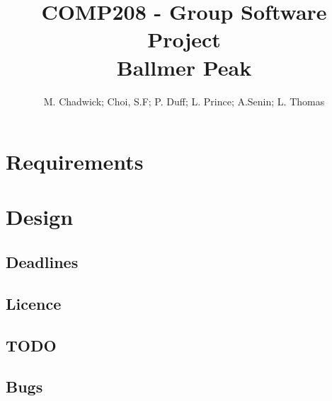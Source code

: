 \documentclass[openany]{book}
\title{COMP208 - Group Software Project\\Ballmer Peak}
\author{M. Chadwick; Choi, S.F; P. Duff; L. Prince; A.Senin; L. Thomas}
\begin{document}
\maketitle
\tableofcontents

\part{Requirements}


\part{Design}


\begin{appendices}
\appendixpage %
\noappendicestocpagenum %
\addappheadtotoc %

\chapter{Deadlines}

\chapter{Licence}

\chapter{TODO}

\chapter{Bugs}

\end{appendices}

\listoftodos
\todototoc

\printbibliography
\end{document}

